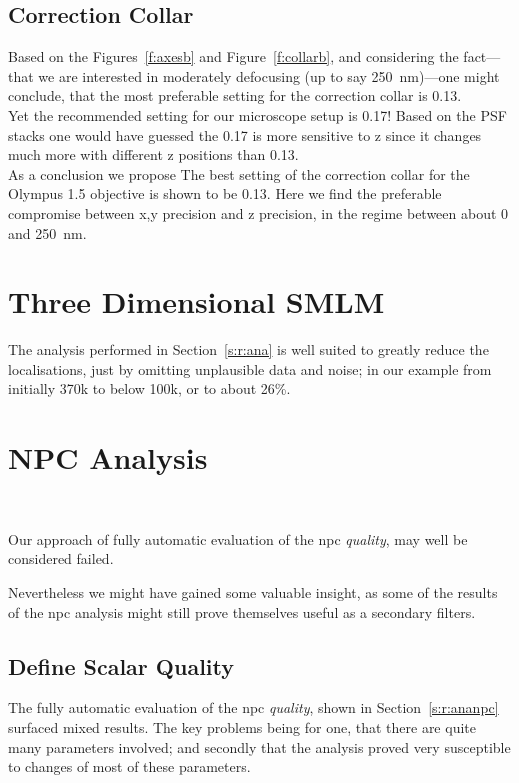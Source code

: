 \documentclass[11pt, a4paper, oneside, twocolumn]{report}
\newcommand{\e}{\emph}
\begin{document}
\subsection{Correction Collar}

Based on the Figures~\ref{f:axesb} and Figure~\ref{f:collarb}, and
considering the fact---that we are interested in moderately defocusing
(up to say \SI{250}{\nano\meter})---one might conclude, that the most
preferable setting for the correction collar is 0.13.\\

Yet the recommended setting for our microscope setup is 0.17! Based on
the PSF stacks one would have guessed the 0.17 is more sensitive to z
since it changes much more with different z positions than 0.13.\\

As a conclusion we propose The best setting of the correction collar
for the Olympus \SI{1.5}{\NA} objective is shown to be 0.13. Here we
find the preferable compromise between x,y precision and z precision,
in the regime between about 0 and \SI{250}{\nano\meter}.


\section{Three Dimensional SMLM}

The analysis performed in Section~\ref{s:r:ana} is well suited to
greatly reduce the localisations, just by omitting unplausible data
and noise; in our example from initially 370k to below 100k, or to
about 26\%.


\section{NPC Analysis}~\label{s:d:ananpc}

Our approach of fully automatic evaluation of the \gls{npc}
\e{quality}, may well be considered failed.

Nevertheless we might have gained some valuable insight, as some of
the results of the \gls{npc} analysis might still prove themselves
useful as a secondary filters.


\subsection{Define Scalar Quality}

The fully automatic evaluation of the \gls{npc} \e{quality}, shown in
Section~\ref{s:r:ananpc} surfaced mixed results. The key problems
being for one, that there are quite many parameters involved; and
secondly that the analysis proved very susceptible to changes of most
of these parameters.\\
\end{document}
